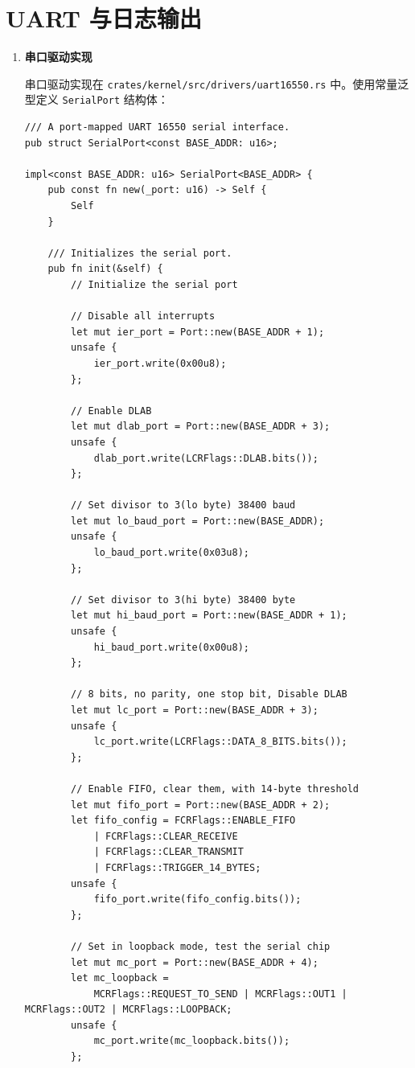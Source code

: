\documentclass{SYSUReport}
\begin{document}
\section{UART 与日志输出}

\begin{enumerate}[label={\chinese*、},labelsep=0pt, start=5]

    \item \textbf{串口驱动实现}

    串口驱动实现在 \texttt{crates/kernel/src/drivers/uart16550.rs} 中。使用常量泛型定义 \texttt{SerialPort} 结构体：

    \begin{verbatim}
/// A port-mapped UART 16550 serial interface.
pub struct SerialPort<const BASE_ADDR: u16>;

impl<const BASE_ADDR: u16> SerialPort<BASE_ADDR> {
    pub const fn new(_port: u16) -> Self {
        Self
    }

    /// Initializes the serial port.
    pub fn init(&self) {
        // Initialize the serial port

        // Disable all interrupts
        let mut ier_port = Port::new(BASE_ADDR + 1);
        unsafe {
            ier_port.write(0x00u8);
        };

        // Enable DLAB
        let mut dlab_port = Port::new(BASE_ADDR + 3);
        unsafe {
            dlab_port.write(LCRFlags::DLAB.bits());
        };

        // Set divisor to 3(lo byte) 38400 baud
        let mut lo_baud_port = Port::new(BASE_ADDR);
        unsafe {
            lo_baud_port.write(0x03u8);
        };

        // Set divisor to 3(hi byte) 38400 byte
        let mut hi_baud_port = Port::new(BASE_ADDR + 1);
        unsafe {
            hi_baud_port.write(0x00u8);
        };

        // 8 bits, no parity, one stop bit, Disable DLAB
        let mut lc_port = Port::new(BASE_ADDR + 3);
        unsafe {
            lc_port.write(LCRFlags::DATA_8_BITS.bits());
        };

        // Enable FIFO, clear them, with 14-byte threshold
        let mut fifo_port = Port::new(BASE_ADDR + 2);
        let fifo_config = FCRFlags::ENABLE_FIFO
            | FCRFlags::CLEAR_RECEIVE
            | FCRFlags::CLEAR_TRANSMIT
            | FCRFlags::TRIGGER_14_BYTES;
        unsafe {
            fifo_port.write(fifo_config.bits());
        };

        // Set in loopback mode, test the serial chip
        let mut mc_port = Port::new(BASE_ADDR + 4);
        let mc_loopback =
            MCRFlags::REQUEST_TO_SEND | MCRFlags::OUT1 | MCRFlags::OUT2 | MCRFlags::LOOPBACK;
        unsafe {
            mc_port.write(mc_loopback.bits());
        };


\end{verbatim}
\end{enumerate}
\end{document}
